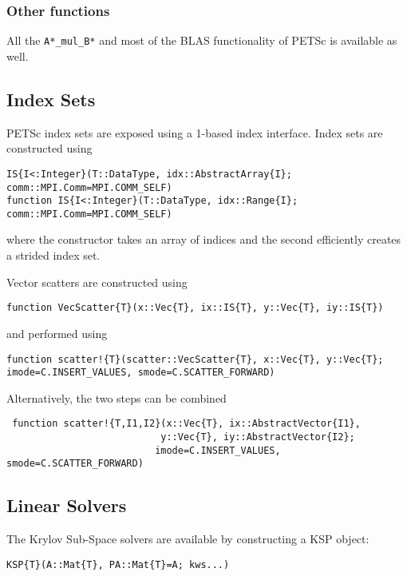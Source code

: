 \documentclass{article}
\newcommand{\ttt}{\texttt}
\begin{document}
\subsubsection{Other functions}
All the \ttt{A*\_mul\_B*} and most of the BLAS functionality of PETSc is available as well.

\subsection{Index Sets} \label{sec:is}
PETSc index sets are exposed using a 1-based index interface.
Index sets are constructed using

\begin{verbatim}
IS{I<:Integer}(T::DataType, idx::AbstractArray{I}; comm::MPI.Comm=MPI.COMM_SELF)
function IS{I<:Integer}(T::DataType, idx::Range{I}; comm::MPI.Comm=MPI.COMM_SELF)
\end{verbatim}

where the constructor takes an array of indices and the second efficiently creates a strided index set.

Vector scatters are constructed using

\begin{verbatim}
function VecScatter{T}(x::Vec{T}, ix::IS{T}, y::Vec{T}, iy::IS{T})
\end{verbatim}

and performed using

\begin{verbatim}
function scatter!{T}(scatter::VecScatter{T}, x::Vec{T}, y::Vec{T}; imode=C.INSERT_VALUES, smode=C.SCATTER_FORWARD)
\end{verbatim}

Alternatively, the two steps can be combined
\begin{verbatim}
 function scatter!{T,I1,I2}(x::Vec{T}, ix::AbstractVector{I1},
                           y::Vec{T}, iy::AbstractVector{I2};
                          imode=C.INSERT_VALUES, smode=C.SCATTER_FORWARD)
\end{verbatim}


\subsection{Linear Solvers} \label{sec:ksp}
The Krylov Sub-Space solvers are available by constructing a KSP object:
\begin{verbatim}
KSP{T}(A::Mat{T}, PA::Mat{T}=A; kws...)
\end{verbatim}
\end{document}
